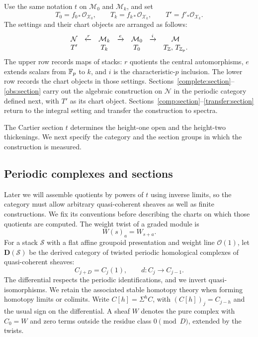 Use the same notation $t$ on $\mathcal M_0$ and $\mathcal M_k$, and set
\begin{equation}\label{geom:characteristic-chart-sheaves}
 T_0=f_{0*}\mathcal O_{\mathcal X_0},\qquad
 T_k=f_{k*}\mathcal O_{\mathcal X_k},\qquad
 T'=f'_*\mathcal O_{\mathcal X_k}.
\end{equation}
The settings and their chart objects are arranged as follows:
\[
\begin{array}{ccccccc}
 \mathcal N&\xleftarrow{r}&\mathcal M_k&\xrightarrow{e}&\mathcal M_0&
 \xrightarrow{i}&\mathcal M\\
 T'&&T_k&&T_0&&T_{\mathbb Z},\,T_{\mathbb Z_p}.
\end{array}
\]
The upper row records maps of stacks: $r$ quotients the central
automorphisms, $e$ extends scalars from $\mathbb F_p$ to $k$, and $i$ is the
characteristic-$p$ inclusion.  The lower row records the chart objects
in those settings.  Sections~\ref{complete:section}--\ref{obs:section}
carry out the algebraic construction on $\mathcal N$ in the periodic
category defined next, with $T'$ as its chart object.
Sections~\ref{comp:section}--\ref{transfer:section} return to the
integral setting and transfer the construction to spectra.

The Cartier section $t$ determines the height-one open and the
height-two thickenings.  We next specify the category and the section
groups in which the construction is measured.

\subsection{Periodic complexes and sections}
\label{geom:periodic-foundations}

Later we will assemble quotients by powers of $t$ using inverse limits,
so the category must allow arbitrary quasi-coherent sheaves as well as
finite constructions.  We fix its conventions before describing the
charts on which those quotients are computed.  The weight twist of a
graded module is
\[
 W(s)_a=W_{s+a}.
\]
For a stack $\mathcal S$ with a flat affine groupoid presentation and
weight line $\mathcal O(1)$, let $\mathbf D(\mathcal S)$ be the derived
category of twisted periodic homological complexes of quasi-coherent
sheaves:
\begin{equation}\label{geom:periodic-complex}
 C_{j+D}=C_j(1),\qquad d:C_j\longrightarrow C_{j-1}.
\end{equation}
The differential respects the periodic identifications, and we invert
quasi-isomorphisms.  We retain the associated stable homotopy theory
when forming homotopy limits or colimits.  Write $C[h]=\Sigma^hC$,
with $(C[h])_j=C_{j-h}$ and the usual sign on the differential.
A sheaf $W$ denotes the pure complex with $C_0=W$ and zero terms
outside the residue class $0\pmod D$, extended by the twists.

